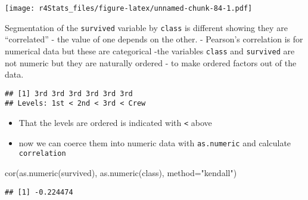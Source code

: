 \documentclass[
]{book}
\newenvironment{Shaded}{\begin{snugshade}}{\end{snugshade}}
\newcommand{\AttributeTok}[1]{\textcolor[rgb]{0.77,0.63,0.00}{#1}}
\newcommand{\FunctionTok}[1]{\textcolor[rgb]{0.00,0.00,0.00}{#1}}
\newcommand{\NormalTok}[1]{#1}
\newcommand{\OtherTok}[1]{\textcolor[rgb]{0.56,0.35,0.01}{#1}}
\newcommand{\SpecialCharTok}[1]{\textcolor[rgb]{0.00,0.00,0.00}{#1}}
\newcommand{\StringTok}[1]{\textcolor[rgb]{0.31,0.60,0.02}{#1}}
\providecommand{\tightlist}{%
  \setlength{\itemsep}{0pt}\setlength{\parskip}{0pt}}
\theoremstyle{definition}
\theoremstyle{definition}
\theoremstyle{definition}
\theoremstyle{definition}
\theoremstyle{remark}
\begin{document}
\texttt{[image: r4Stats\_files/figure-latex/unnamed-chunk-84-1.pdf]}

Segmentation of the \texttt{survived} variable by \texttt{class} is different showing they are ``correlated'' - the value of one depends on the other.
- Pearson's correlation is for numerical data but these are categorical
-the variables \texttt{class} and \texttt{survived} are not numeric but they are naturally ordered
- to make ordered factors out of the data.

\begin{Shaded}
\end{Shaded}

\begin{verbatim}
## [1] 3rd 3rd 3rd 3rd 3rd 3rd
## Levels: 1st < 2nd < 3rd < Crew
\end{verbatim}

\begin{itemize}
\tightlist
\item
  That the levels are ordered is indicated with \texttt{\textless{}} above
\item
  now we can coerce them into numeric data with \texttt{as.numeric} and calculate \texttt{correlation}
\end{itemize}

\begin{Shaded}
\begin{Highlighting}[]
\FunctionTok{cor}\NormalTok{(}\FunctionTok{as.numeric}\NormalTok{(survived), }\FunctionTok{as.numeric}\NormalTok{(class), }\AttributeTok{method=}\StringTok{"kendall"}\NormalTok{)}
\end{Highlighting}
\end{Shaded}

\begin{verbatim}
## [1] -0.224474
\end{verbatim}
\end{document}
